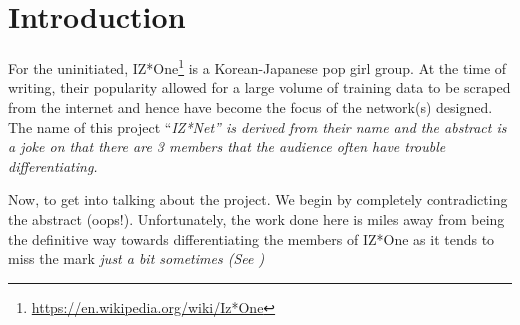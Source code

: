 \section{Introduction}
For the uninitiated, IZ*One\footnote{\url{https://en.wikipedia.org/wiki/Iz*One}} is a Korean-Japanese pop girl group.
At the time of writing, their popularity allowed for a large volume of training data to be scraped from the internet and hence have become the focus of the network(s) designed.
The name of this project ``\it{IZ*Net}'' is derived from their name and the abstract is a joke on that there are 3 members that the audience often have trouble differentiating.

Now, to get into talking about the project.
We begin by completely contradicting the abstract (oops!).
Unfortunately, the work done here is miles away from being the definitive way towards differentiating the members of IZ*One as it tends to miss the mark \it{just a bit} sometimes (See )

